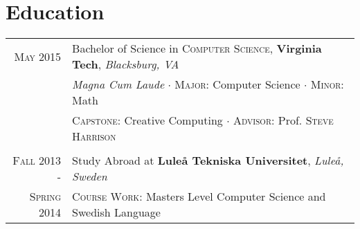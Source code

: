 \documentclass[letterpaper,10pt]{article}
\begin{document}

\section{Education}
\begin{tabular}{R|B}
	\textsc{May} 2015                & Bachelor of Science in \textsc{Computer Science}, \textbf{Virginia Tech}, \emph{Blacksburg, VA}     \\
	                                 & \small\emph{Magna Cum Laude} $\cdot$ \textsc{Major}: Computer Science $\cdot$ \textsc{Minor}: Math  \\
	                                 & \small\textsc{Capstone}: Creative Computing $\cdot$ \textsc{Advisor}: Prof. \textsc{Steve Harrison} \\
	                                                                                                                   \\

	\textsc{Fall} 2013 -             & Study Abroad at \textbf{Luleå Tekniska Universitet}, \emph{Luleå, Sweden}                           \\
	\textsc{Spring} 2014\phantom{ -} & \small\textsc{Course Work}: Masters Level Computer Science and Swedish Language
\end{tabular}
\end{document}
